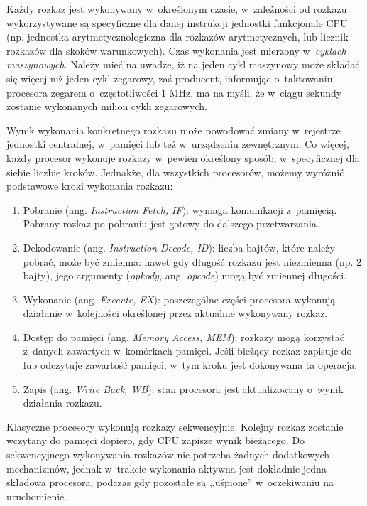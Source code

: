\documentclass[12pt]{mwart}
\begin{document}
	Każdy rozkaz jest wykonywany w~określonym czasie, w~zależności od rozkazu wykorzystywane są specyficzne dla danej instrukcji
	jednostki funkcjonale CPU (np. jednostka arytmetyczno\dywiz logiczna dla rozkazów arytmetycznych, lub licznik rozkazów
	dla skoków warunkowych). Czas wykonania jest mierzony w~\emph{cyklach maszynowych}. Należy mieć na uwadze, 
	iż na jeden cykl maszynowy może składać się więcej niż jeden cykl zegarowy, zaś
	producent, informując o~taktowaniu procesora zegarem o~częstotliwości 1 MHz, ma na myśli, że
	w~ciągu sekundy zostanie wykonanych milion cykli zegarowych.
\par
%
\indent
	Wynik wykonania konkretnego rozkazu może powodować zmiany w~rejestrze jednostki centralnej, w~pamięci lub
	też w~urządzeniu zewnętrznym. Co więcej, każdy procesor wykonuje rozkazy w~pewien określony sposób, w~specyficznej dla siebie liczbie kroków.
	Jednakże, dla wszystkich procesorów, możemy wyróżnić podstawowe kroki wykonania rozkazu:
	\begin{enumerate}
	\item Pobranie (ang. \emph{Instruction Fetch, IF}): wymaga komunikacji z~pamięcią.
		Pobrany rozkaz po pobraniu jest gotowy do dalszego przetwarzania.
	\item Dekodowanie (ang. \emph{Instruction Decode, ID}):  liczba bajtów, które należy pobrać, może być zmienna:
		nawet gdy długość rozkazu jest niezmienna (np. 2 bajty), jego argumenty (\emph{opkody}, ang. \emph{opcode}) mogą być zmiennej długości.
	\item Wykonanie (ang. \emph{Execute, EX}): poszczególne części procesora wykonują działanie w~kolejności określonej przez aktualnie
		wykonywany rozkaz.
	\item Dostęp do pamięci (ang. \emph{Memory Access, MEM}): rozkazy mogą korzystać z~danych zawartych w~komórkach pamięci. Jeśli bieżący rozkaz
		zapisuje do lub odczytuje zawartość pamięci, w~tym kroku jest dokonywana ta operacja.
	\item Zapis (ang. \emph{Write Back, WB}): stan procesora jest aktualizowany o~wynik działania rozkazu.
	\end{enumerate}
\par
%
\indent
	Klasyczne procesory wykonują rozkazy sekwencyjnie. Kolejny rozkaz zostanie wczytany do pamięci dopiero, gdy
	CPU zapisze wynik bieżącego. Do sekwencyjnego wykonywania rozkazów nie potrzeba żadnych dodatkowych mechanizmów,
	jednak w~trakcie wykonania aktywna jest dokładnie jedna składowa procesora, podczas gdy pozostałe są ,,uśpione''
	w~oczekiwaniu na uruchomienie.
\end{document}
